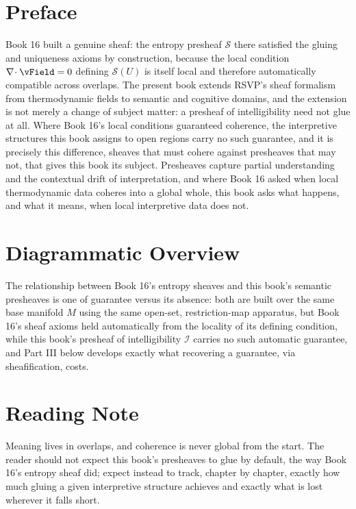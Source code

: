 \chapter*{Preface}

Book 16 built a genuine sheaf: the entropy presheaf $\mathcal{S}$ there satisfied the gluing and uniqueness axioms by construction, because the local condition $\diverg \vField = 0$ defining $\mathcal{S}(U)$ is itself local and therefore automatically compatible across overlaps. The present book extends RSVP's sheaf formalism from thermodynamic fields to semantic and cognitive domains, and the extension is not merely a change of subject matter: a presheaf of intelligibility need not glue at all. Where Book 16's local conditions guaranteed coherence, the interpretive structures this book assigns to open regions carry no such guarantee, and it is precisely this difference, sheaves that must cohere against presheaves that may not, that gives this book its subject. Presheaves capture partial understanding and the contextual drift of interpretation, and where Book 16 asked when local thermodynamic data coheres into a global whole, this book asks what happens, and what it means, when local interpretive data does not.

\chapter*{Diagrammatic Overview}

The relationship between Book 16's entropy sheaves and this book's semantic presheaves is one of guarantee versus its absence: both are built over the same base manifold $M$ using the same open-set, restriction-map apparatus, but Book 16's sheaf axioms held automatically from the locality of its defining condition, while this book's presheaf of intelligibility $\mathcal{I}$ carries no such automatic guarantee, and Part III below develops exactly what recovering a guarantee, via sheafification, costs.

\chapter*{Reading Note}

Meaning lives in overlaps, and coherence is never global from the start. The reader should not expect this book's presheaves to glue by default, the way Book 16's entropy sheaf did; expect instead to track, chapter by chapter, exactly how much gluing a given interpretive structure achieves and exactly what is lost wherever it falls short.


